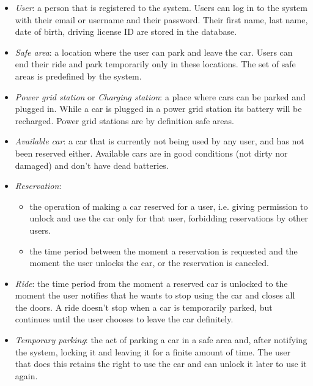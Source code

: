 \documentclass[english]{article}
\begin{document}
\begin{itemize}
\item{\textit{User}: a person that is registered to the system. Users can log in to the system with their email or username and their password. Their first name, last name, date of birth, driving license ID are stored in the database.}
\item{\textit{Safe area}: a location where the user can park and leave the car. Users can end their ride and park temporarily only in these locations. The set of safe areas is predefined by the system.}
\item{\textit{Power grid station} or \textit{Charging station}: a place where cars can be parked and plugged in. While a car is plugged in a power grid station its battery will be recharged. Power grid stations are by definition safe areas.}
\item{\textit{Available car}: a car that is currently not being used by any user, and has not been reserved either. Available cars are in good conditions (not dirty nor damaged) and don't have dead batteries.}
\item{\textit{Reservation}:
	\begin{itemize}
		\item{the operation of making a car reserved for a user, i.e. giving permission to unlock and use the car only for that user, forbidding reservations by other users.}
		\item{the time period between the moment a reservation is requested and the moment the user unlocks the car, or the reservation is canceled.}
	\end{itemize}
}
\item{\textit{Ride}: the time period from the moment a reserved car is unlocked to the moment the user notifies that he wants to stop using the car and closes all the doors. A ride doesn't stop when a car is temporarily parked, but continues until the user chooses to leave the car definitely.}
\item{\textit{Temporary parking}: the act of parking a car in a safe area and, after notifying the system, locking it and leaving it for a finite amount of time. The user that does this retains the right to use the car and can unlock it later to use it again.}

\end{itemize}
\end{document}
